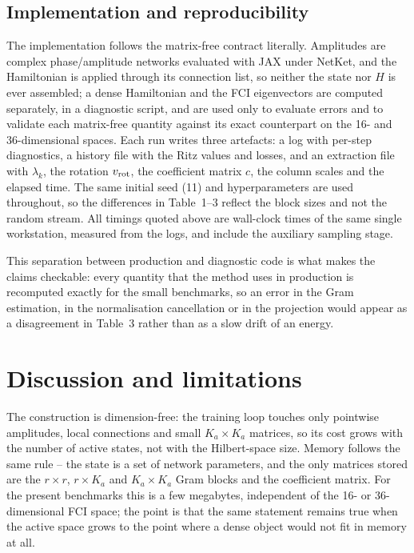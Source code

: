 \documentclass[10pt,a4paper]{article}
\begin{document}
\subsection{Implementation and reproducibility}

The implementation follows the matrix-free contract literally. Amplitudes are complex phase/amplitude networks evaluated with JAX under NetKet, and the Hamiltonian is applied through its connection list, so neither the state nor $H$ is ever assembled; a dense Hamiltonian and the FCI eigenvectors are computed separately, in a diagnostic script, and are used only to evaluate errors and to validate each matrix-free quantity against its exact counterpart on the 16- and 36-dimensional spaces. Each run writes three artefacts: a log with per-step diagnostics, a history file with the Ritz values and losses, and an extraction file with $\lambda_k$, the rotation $v_{\rm rot}$, the coefficient matrix $c$, the column scales and the elapsed time. The same initial seed (11) and hyperparameters are used throughout, so the differences in Table~1--3 reflect the block sizes and not the random stream. All timings quoted above are wall-clock times of the same single workstation, measured from the logs, and include the auxiliary sampling stage.

This separation between production and diagnostic code is what makes the claims checkable: every quantity that the method uses in production is recomputed exactly for the small benchmarks, so an error in the Gram estimation, in the normalisation cancellation or in the projection would appear as a disagreement in Table~3 rather than as a slow drift of an energy.

\section{Discussion and limitations}

The construction is dimension-free: the training loop touches only pointwise amplitudes, local connections and small $K_a\times K_a$ matrices, so its cost grows with the number of active states, not with the Hilbert-space size. Memory follows the same rule -- the state is a set of network parameters, and the only matrices stored are the $r\times r$, $r\times K_a$ and $K_a\times K_a$ Gram blocks and the coefficient matrix. For the present benchmarks this is a few megabytes, independent of the 16- or 36-dimensional FCI space; the point is that the same statement remains true when the active space grows to the point where a dense object would not fit in memory at all.
\end{document}
